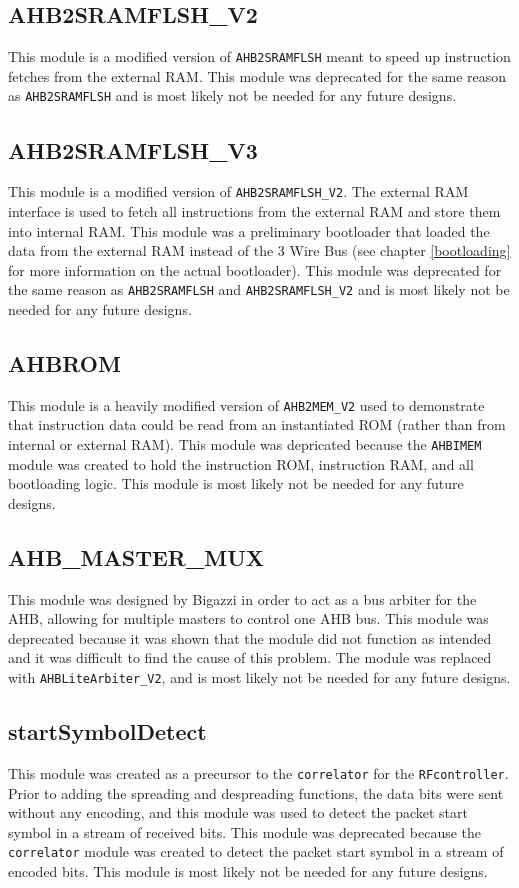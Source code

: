 \subsection{AHB2SRAMFLSH\_V2}
This module is a modified version of \texttt{AHB2SRAMFLSH} meant to speed up instruction fetches from the external RAM. This module was deprecated for the same reason as \texttt{AHB2SRAMFLSH} and is most likely not be needed for any future designs.

\subsection{AHB2SRAMFLSH\_V3}
This module is a modified version of \texttt{AHB2SRAMFLSH\_V2}. The external RAM interface is used to fetch all instructions from the external RAM and store them into internal RAM. This module was a preliminary bootloader that loaded the data from the external RAM instead of the 3 Wire Bus (see chapter \ref{bootloading} for more information on the actual bootloader). This module was deprecated for the same reason as \texttt{AHB2SRAMFLSH} and \texttt{AHB2SRAMFLSH\_V2} and is most likely not be needed for any future designs.

\subsection{AHBROM}
This module is a heavily modified version of \texttt{AHB2MEM\_V2} used to demonstrate that instruction data could be read from an instantiated ROM (rather than from internal or external RAM). This module was depricated because the \texttt{AHBIMEM} module was created to hold the instruction ROM, instruction RAM, and all bootloading logic. This module is most likely not be needed for any future designs. %

\subsection{AHB\_MASTER\_MUX}
This module was designed by Bigazzi in order to act as a bus arbiter for the AHB, allowing for multiple masters to control one AHB bus. This module was deprecated because it was shown that the module did not function as intended and it was difficult to find the cause of this problem. The module was replaced with \texttt{AHBLiteArbiter\_V2}, and is most likely not be needed for any future designs.

\subsection{startSymbolDetect}
This module was created as a precursor to the \texttt{correlator} for the \texttt{RFcontroller}. Prior to adding the spreading and despreading functions, the data bits were sent without any encoding, and this module was used to detect the packet start symbol in a stream of received bits. This module was deprecated because the \texttt{correlator} module was created to detect the packet start symbol in a stream of encoded bits. This module is most likely not be needed for any future designs.


